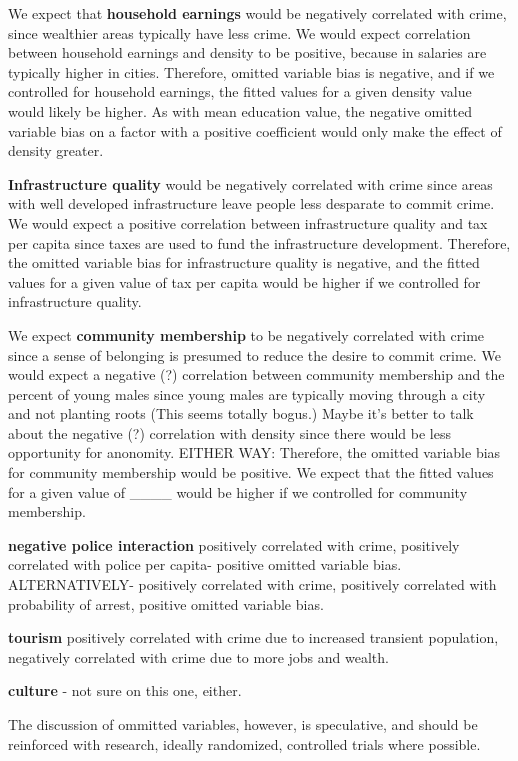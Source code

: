 \documentclass[]{article}
\begin{document}
We expect that \textbf{household earnings} would be negatively
correlated with crime, since wealthier areas typically have less crime.
We would expect correlation between household earnings and density to be
positive, because in salaries are typically higher in cities. Therefore,
omitted variable bias is negative, and if we controlled for household
earnings, the fitted values for a given density value would likely be
higher. As with mean education value, the negative omitted variable bias
on a factor with a positive coefficient would only make the effect of
density greater.

\textbf{Infrastructure quality} would be negatively correlated with
crime since areas with well developed infrastructure leave people less
desparate to commit crime. We would expect a positive correlation
between infrastructure quality and tax per capita since taxes are used
to fund the infrastructure development. Therefore, the omitted variable
bias for infrastructure quality is negative, and the fitted values for a
given value of tax per capita would be higher if we controlled for
infrastructure quality.

We expect \textbf{community membership} to be negatively correlated with
crime since a sense of belonging is presumed to reduce the desire to
commit crime. We would expect a negative (?) correlation between
community membership and the percent of young males since young males
are typically moving through a city and not planting roots (This seems
totally bogus.) Maybe it's better to talk about the negative (?)
correlation with density since there would be less opportunity for
anonomity. EITHER WAY: Therefore, the omitted variable bias for
community membership would be positive. We expect that the fitted values
for a given value of \_\_\_\_ would be higher if we controlled for
community membership.

\textbf{negative police interaction} positively correlated with crime,
positively correlated with police per capita- positive omitted variable
bias. ALTERNATIVELY- positively correlated with crime, positively
correlated with probability of arrest, positive omitted variable bias.

\textbf{tourism} positively correlated with crime due to increased
transient population, negatively correlated with crime due to more jobs
and wealth.

\textbf{culture} - not sure on this one, either.

The discussion of ommitted variables, however, is speculative, and
should be reinforced with research, ideally randomized, controlled
trials where possible.
\end{document}
